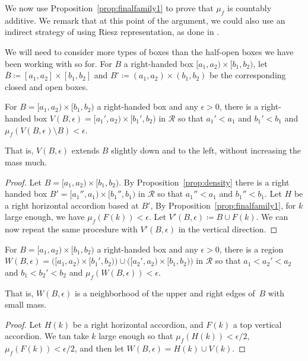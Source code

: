 We now use Proposition~\ref{prop:finalfamily1} to prove that $\mu_f$
is countably additive.
We remark that at this point of the argument, we could also use an indirect strategy of using Riesz representation, as done in \cite[Proposition~3.11]{BIPP21:PositiveCrossratios}.

We will need to consider more types of boxes
than the half-open boxes we have been working with so for. For $B$ a
right-handed box $[a_1,a_2) \times [b_1,b_2)$, let
$\overline{B} \coloneqq [a_1,a_2] \times [b_1,b_2]$ and
$B^\circ \coloneqq (a_1,a_2) \times (b_1,b_2)$ be the corresponding
closed and open boxes.

\begin{lemma}\label{lem:extend1}
  For $B = [a_1,a_2) \times [b_1,b_2)$ a right-handed box and
  any $\epsilon > 0$, there is a right-handed box $V(B,\epsilon) =
  [a_1',a_2) \times [b_1',b_2)$ in $\mathcal{R}$ so that
  $a_1' < a_1$ and $b_1' < b_1$ and
  $\mu_f(V(B,\epsilon) \setminus B) < \epsilon$.
\end{lemma}

That is, $V(B,\epsilon)$ extends $B$ slightly down and to the left,
without increasing the mass much.

\begin{proof}
  Let $B = [a_1,a_2) \times [b_1,b_2)$. By Proposition~\ref{prop:density} there is a right handed box $B'=[a_1'',a_1) \times [b_1'',b_1)$ in $\mathcal{R}$ so that
  $a_1'' < a_1$ and $b_1'' < b_1$.
  Let $H$ be a right horizontal accordion based at $B'$,
  By Proposition~\ref{prop:finalfamily1}, for $k$ large enough, we have $\mu_f(F(k))<\epsilon$. 
  Let $V'(B,\epsilon) \coloneqq B \cup F(k)$.
  We can now repeat the same procedure with $V'(B,\epsilon)$ in the vertical direction.
\end{proof}

\begin{lemma}\label{lem:extend2}
  For $B = [a_1,a_2) \times [b_1,b_2)$ a right-handed box and
  any $\epsilon > 0$, there is a region $W(B,\epsilon) =
  \bigl([a_1,a_2) \times [b_1',b_2)\bigr) \cup
  \bigl([a_2',a_2) \times [b_1,b_2)\bigr)$ in $\mathcal{R}$ so that
  $a_1 < a_2' < a_2$ and $b_1 < b_2' < b_2$ and
  $\mu_f(W(B,\epsilon)) < \epsilon$.
\end{lemma}

That is, $W(B,\epsilon)$ is a neighborhood of the upper and right
edges of~$B$ with small mass.

\begin{proof}
Let $H(k)$ be a right horizontal accordion, and $F(k)$ a top vertical accordion.
We tan take $k$ large enough so that $\mu_f(H(k)) < \epsilon/2$,  $\mu_f(F(k)) < \epsilon/2$, and then let $W(B,\epsilon) = H(k) \cup V(k)$.
\end{proof}
  
